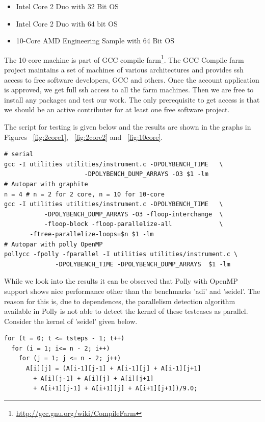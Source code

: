 \begin{itemize}
\item Intel Core 2 Duo with 32 Bit OS
\item Intel Core 2 Duo with 64 bit OS
\item 10-Core AMD Engineering Sample with 64 Bit OS
\end{itemize}
The 10-core machine is part of GCC compile farm\footnote{\url{http://gcc.gnu.org/wiki/CompileFarm}}. The GCC Compile farm project maintains
a set of machines of various architectures and provides ssh access to free software developers, GCC and others.
Once the account application  is approved, we get full ssh access to all the farm machines. Then we
are free to install any packages and test our work. The only prerequisite to get access is that
we should be an active contributer for at least one free software project.

The script for testing is given below and the results are shown in the graphs in
Figures ~\ref{fig:2core1}, ~\ref{fig:2core2} and ~\ref{fig:10core}.
{\footnotesize
\begin{lstlisting}
# serial
gcc -I utilities utilities/instrument.c -DPOLYBENCH_TIME   \
                      -DPOLYBENCH_DUMP_ARRAYS -O3 $1 -lm
# Autopar with graphite
n = 4 # n = 2 for 2 core, n = 10 for 10-core
gcc -I utilities utilities/instrument.c -DPOLYBENCH_TIME   \
           -DPOLYBENCH_DUMP_ARRAYS -O3 -floop-interchange  \
           -floop-block -floop-parallelize-all             \
	   -ftree-parallelize-loops=$n $1 -lm
# Autopar with polly OpenMP
pollycc -fpolly -fparallel -I utilities utilities/instrument.c \
              -DPOLYBENCH_TIME -DPOLYBENCH_DUMP_ARRAYS  $1 -lm
\end{lstlisting}
}
While we look into the results it can be observed that Polly with OpenMP support
shows nice performance other than the benchmarks 'adi' and 'seidel'. The reason
for this is, due to dependences, the parallelism detection algorithm available
in Polly is not able to detect the kernel of these testcases as parallel. Consider
the kernel of 'seidel' given below.

{\footnotesize
\begin{lstlisting}
for (t = 0; t <= tsteps - 1; t++)
  for (i = 1; i<= n - 2; i++)
    for (j = 1; j <= n - 2; j++)
      A[i][j] = (A[i-1][j-1] + A[i-1][j] + A[i-1][j+1]
		+ A[i][j-1] + A[i][j] + A[i][j+1]
		+ A[i+1][j-1] + A[i+1][j] + A[i+1][j+1])/9.0;
\end{lstlisting}
}


